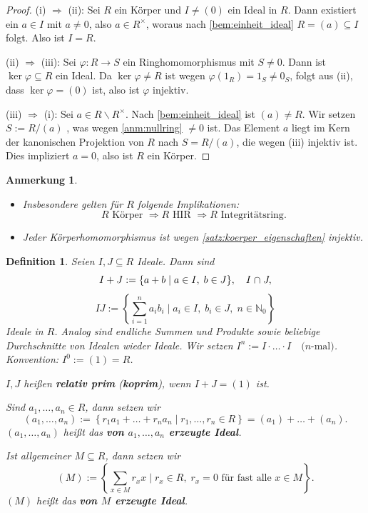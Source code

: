 \documentclass[a4paper, twoside, 11pt, ngerman]{report}
\newcommand{\NN}{\mathds N}
\renewcommand{\setminus}{\smallsetminus}
\renewcommand{\cap}{\;\rotatebox{90}{\reflectbox{\rotatebox{270}{$\cup$}}}\;}
\theoremstyle{definistyle}
\newtheorem{defini}[satz]{Definition}
\newtheorem{anm}[satz]{Anmerkung}
\theoremstyle{remark}
\newcommand{\defn}[1]{\textit{\bfseries #1}}
\begin{document}
\begin{proof}
(i) $\Rightarrow$ (ii): Sei $R$ ein Körper und $I \neq (0)$ ein Ideal in $R$. Dann existiert ein $a \in I$ mit $a \neq 0$, also $a \in R^{\times}$,  woraus nach \ref{bem:einheit_ideal} $R = (a) \subseteq I$ folgt. Also ist $I = R$.

(ii) $\Rightarrow$ (iii): Sei $\varphi \colon R \to S$ ein Ringhomomorphismus mit $S \neq 0$. Dann ist $\ker \varphi \subseteq R$ ein Ideal. Da $\ker \varphi \neq R$ ist wegen $\varphi(1_R) = 1_S \neq 0_S$, folgt aus (ii), dass $\ker \varphi = (0)$ ist, also ist $\varphi$ injektiv.

(iii) $\Rightarrow$ (i): Sei $a \in R \setminus R^{\times}$. Nach \ref{bem:einheit_ideal} ist $(a) \neq R$. Wir setzen $S := R / (a)$ , was wegen \ref{anm:nullring} $ \neq 0$ ist. Das Element $a$ liegt im Kern der kanonischen Projektion von $R$ nach $S=R/(a)$, die wegen (iii) injektiv ist. Dies impliziert $a = 0$, also ist $R$ ein Körper.
\end{proof}

\begin{anm}\label{anm:hinweise_struktur_r}
\begin{itemize}
\item Insbesondere gelten für $R$ folgende Implikationen:
\[
R \text{ Körper } \Rightarrow R \text{ HIR } \Rightarrow R \text{ Integritätsring}.
\]
\item Jeder Körperhomomorphismus ist wegen \ref{satz:koerper_eigenschaften} injektiv.
\end{itemize}
\end{anm}

\begin{defini}\label{def:summe_produkt_ideale}
Seien $I, J \subseteq R$ Ideale. Dann sind
\[
I + J := \{ a + b \mid a \in I, \; b \in J \}, \quad I\cap J,
\]
\[
I J := \left\{ \sum_{i=1}^n a_i b_i \mid a_i \in I, \; b_i \in J, \; n \in \NN_0 \right\}
\]
Ideale in $R$. Analog sind endliche Summen und Produkte sowie beliebige Durchschnitte von Idealen wieder Ideale. Wir setzen $I^n := I\cdot \ldots\cdot I \quad \text{($n$-mal)}$. Konvention: $I^0 := (1) = R$.

$I,J$ heißen \defn{relativ prim} (\defn{koprim}), wenn $I+J=(1)$ ist.

Sind $a_1, \ldots, a_n \in R$, dann setzen wir
\[
(a_1, \ldots, a_n) := \left\{ r_1 a_1 + \dots + r_n a_n \mid r_1, \ldots, r_n \in R \right\} = (a_1) + \dots + (a_n).
\]
$(a_1, \ldots, a_n)$ heißt das \defn{von $a_1, \ldots, a_n$ erzeugte Ideal}.

Ist allgemeiner $M \subseteq R$, dann setzen wir
\[
(M) := \left\{ \sum_{x \in M} r_x x \mid r_x \in R, \; r_x = 0 \text{ für fast alle } x \in M \right\}.
\]
$(M)$ heißt das \defn{von $M$ erzeugte Ideal}.
\end{defini}
\end{document}
